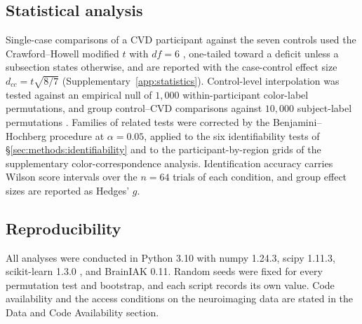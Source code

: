 \subsection{Statistical analysis}
\label{sec:methods:stats}

Single-case comparisons of a CVD participant against the seven controls used the Crawford--Howell modified $t$ with $df = 6$ \parencite{crawford1998}, one-tailed toward a deficit unless a subsection states otherwise, and are reported with the case-control effect size $d_{cc} = t\sqrt{8/7}$ (Supplementary~\cref{app:statistics}). Control-level interpolation was tested against an empirical null of $1{,}000$ within-participant color-label permutations, and group control--CVD comparisons against $10{,}000$ subject-label permutations \parencite{nichols2002}. Families of related tests were corrected by the Benjamini--Hochberg procedure at $\alpha = 0.05$, applied to the six identifiability tests of \S\ref{sec:methods:identifiability} and to the participant-by-region grids of the supplementary color-correspondence analysis. Identification accuracy carries Wilson score intervals over the $n = 64$ trials of each condition, and group effect sizes are reported as Hedges' $g$.

\subsection{Reproducibility}
\label{sec:methods:repro}

All analyses were conducted in Python 3.10 with numpy 1.24.3, scipy 1.11.3, scikit-learn 1.3.0 \parencite{pedregosa2011}, and BrainIAK 0.11. Random seeds were fixed for every permutation test and bootstrap, and each script records its own value. Code availability and the access conditions on the neuroimaging data are stated in the Data and Code Availability section.